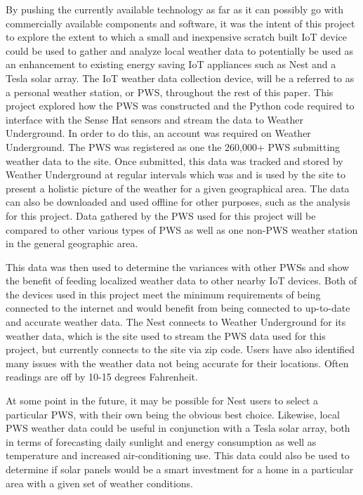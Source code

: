 \documentclass[sigconf]{acmart}
\begin{document}
By pushing the currently available technology as far as it can possibly go with commercially available components and software, it was the intent of this project to explore the extent to which a small and inexpensive scratch built IoT device could be used to gather and analyze local weather data to potentially be used as an enhancement to existing energy saving IoT appliances such as Nest and a Tesla solar array. The IoT weather data collection device, will be a referred to as a personal weather station, or PWS, throughout the rest of this paper. This project explored how the PWS was constructed and the Python code required to interface with the Sense Hat sensors and stream the data to Weather Underground. In order to do this, an account was required on Weather Underground. The PWS was registered as one the 260,000+ PWS submitting weather data to the site. Once submitted, this data was tracked and stored by Weather Underground at regular intervals which was and is used by the site to present a holistic picture of the weather for a given geographical area. The data can also be downloaded and used offline for other purposes, such as the analysis for this project. Data gathered by the PWS used for this project will be compared to other various types of PWS as well as one non-PWS weather station in the general geographic area. 

This data was then used to determine the variances with other PWSs and show the benefit of feeding localized weather data to other nearby IoT devices. Both of the devices used in this project meet the minimum requirements of being connected to the internet and would benefit from being connected to up-to-date and accurate weather data. The Nest connects to Weather Underground for its weather data, which is the site used to stream the PWS data used for this project, but currently connects to the site via zip code. Users have also identified many issues with the weather data not being accurate for their locations\cite{NEST2017}. Often readings are off by 10-15 degrees Fahrenheit\cite{NESTReddit2017}.

At some point in the future, it may be possible for Nest users to select a particular PWS, with their own being the obvious best choice. Likewise, local PWS weather data could be useful in conjunction with a Tesla solar array, both in terms of forecasting daily sunlight and energy consumption as well as temperature and increased air-conditioning use. This data could also be used to determine if solar panels would be a smart investment for a home in a particular area with a given set of weather conditions.
\end{document}
